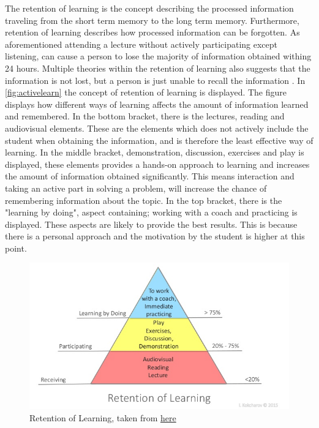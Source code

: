 The retention of learning is the concept describing the processed information traveling from the short term memory to the long term memory. Furthermore, retention of learning describes how processed information can be forgotten. As aforementioned attending a lecture without actively participating except listening, can cause a person to lose the majority of information obtained withing 24 hours. Multiple theories within the retention of learning also suggests that the information is not lost, but a person is just unable to recall the information \cite{retention}.
In \autoref{fig:activelearn} the concept of retention of learning is displayed. The figure displays how different ways of learning affects the amount of information learned and remembered. In the bottom bracket, there is the lectures, reading and audiovisual elements. These are the elements which does not actively include the student when obtaining the information, and is therefore the least effective way of learning. In the middle bracket, demonstration, discussion, exercises and play is displayed, these elements provides a hands-on approach to learning and increases the amount of information obtained significantly. This means interaction and taking an active part in solving a problem, will increase the chance of remembering information about the topic. In the top bracket, there is the "learning by doing", aspect containing; working with a coach and practicing is displayed. These aspects are likely to provide the best results. This is because there is a personal approach and the motivation by the student is higher at this point\cite{retention}. 

\begin{figure}[H]
	\centering
	\includegraphics[width=0.9\linewidth]{figure/Analysis/skillslearn}
	\caption{Retention of Learning, taken from \href{https://www.slideshare.net/igorkokcharov/kokcharov-skillpyramid2015}{\color{blue}here}}
	\label{fig:activelearn}
\end{figure}

